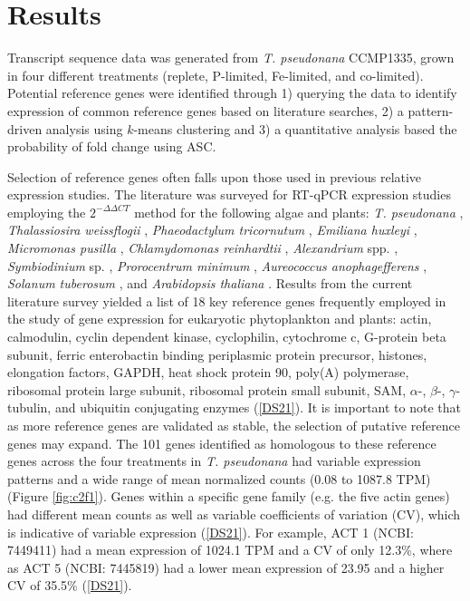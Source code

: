 \section{Results}
Transcript sequence data was generated from \textit{T. pseudonana} CCMP1335, grown in four different treatments (replete, P-limited, Fe-limited, and co-limited). Potential reference genes were identified through 1) querying the data to identify expression of common reference genes based on literature searches, 2) a pattern-driven analysis using $k$-means clustering \citep{Hartigan1979} and 3) a quantitative analysis based the probability of fold change using ASC. \par
Selection of reference genes often falls upon those used in previous relative expression studies. The literature was surveyed for RT-qPCR expression studies employing the $2^{- \Delta \Delta CT}$ method for the following algae and plants: \textit{T. pseudonana} \citep{Maldonado2006, McGinn2008, McGinn2008a, Mock2008, Park2008, Carvalho2011, Whitney2011a}, \textit{Thalassiosira weissflogii} \citep{Davis2006, McGinn2008, Park2008, Whitney2011a}, \textit{Phaeodactylum tricornutum} \citep{Siaut2007, McGinn2008}, \textit{Emiliana huxleyi} \citep{Bruhn2010, Richier2011}, \textit{Micromonas pusilla} \citep{McDonald2010}, \textit{Chlamydomonas reinhardtii} \citep{Moseley2006, Zhao2009}, \textit{Alexandrium} spp. \citep{Lee2009, Moustafa2010}, \textit{Symbiodinium} sp. \citep{Rosic2010, Rosic2010a, Leggat2011}, \textit{Prorocentrum minimum} \citep{Guo2012}, \textit{Aureococcus anophagefferens} \citep{Berg2008, Wurch2011}, \textit{Solanum tuberosum} \citep{Nicot2005}, and \textit{Arabidopsis thaliana} \citep{Avonce2004}. Results from the current literature survey yielded a list of 18 key reference genes frequently employed in the study of gene expression for eukaryotic phytoplankton and plants: actin, calmodulin, cyclin dependent kinase, cyclophilin, cytochrome c, G-protein beta subunit, ferric enterobactin binding periplasmic protein precursor, histones, elongation factors, GAPDH, heat shock protein 90, poly(A) polymerase, ribosomal protein large subunit, ribosomal protein small subunit, SAM, $\alpha$-, $\beta$-, $\gamma$-tubulin, and ubiquitin conjugating enzymes (\ref{DS21}). It is important to note that as more reference genes are validated as stable, the selection of putative reference genes may expand. The 101 genes identified as homologous to these reference genes across the four treatments in \textit{T. pseudonana} had variable expression patterns and a wide range of mean normalized counts (0.08 to 1087.8 TPM) (Figure \ref{fig:c2f1}). Genes within a specific gene family (e.g. the five actin genes) had different mean counts as well as variable coefficients of variation (CV), which is indicative of variable expression (\ref{DS21}). For example, ACT 1 (NCBI: 7449411) had a mean expression of 1024.1 TPM and a CV of only 12.3\%, where as ACT 5 (NCBI: 7445819) had a lower mean expression of 23.95 and a higher CV of 35.5\% (\ref{DS21}). \par

